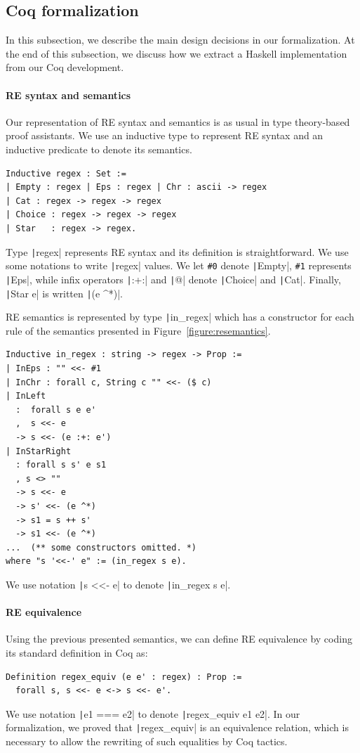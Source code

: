\documentclass[oneside,12pt]{scrbook}
\theoremstyle{definition}
\newcommand{\coq}[1]{\texttt|#1|}
\theoremstyle{plain}
\theoremstyle{definition}
\begin{document}
\subsection{Coq formalization}\label{subsection:coqformalization}

In this subsection, we describe the main design decisions in our formalization. At
the end of this subsection, we discuss how we extract a Haskell implementation from
our Coq development.

\paragraph{RE syntax and semantics} Our representation of RE syntax and
semantics is as usual in type theory-based proof assistants. We use an inductive
type to represent RE syntax and an inductive predicate to denote its semantics.

\begin{verbatim}
Inductive regex : Set :=
| Empty : regex | Eps : regex | Chr : ascii -> regex
| Cat : regex -> regex -> regex
| Choice : regex -> regex -> regex
| Star   : regex -> regex.
\end{verbatim}

Type \coq{regex} represents RE syntax and its definition is straightforward.
We use some notations to write \coq{regex} values. We let \verb|#0| denote
\coq{Empty}, \verb|#1| represents \coq{Eps}, while infix operators \coq{:+:} and
\coq{@} denote \coq{Choice} and \coq{Cat}. Finally, \coq{Star e} is
written \coq{(e ^*)}.

RE semantics is represented by type \coq{in_regex} which has a constructor for each
rule of the semantics presented in Figure~\ref{figure:resemantics}.

\begin{verbatim}
Inductive in_regex : string -> regex -> Prop :=
| InEps : "" <<- #1
| InChr : forall c, String c "" <<- ($ c)
| InLeft
  :  forall s e e'
  ,  s <<- e
  -> s <<- (e :+: e')
| InStarRight              
  : forall s s' e s1 
  , s <> ""  
  -> s <<- e
  -> s' <<- (e ^*)
  -> s1 = s ++ s'
  -> s1 <<- (e ^*)
...  (** some constructors omitted. *)
where "s '<<-' e" := (in_regex s e).
\end{verbatim}
We use notation \coq{s <<- e} to denote \coq{in_regex s e}.

\paragraph{RE equivalence} Using the previous presented semantics, we can define
RE equivalence by coding its standard definition in Coq as:
\begin{verbatim}
Definition regex_equiv (e e' : regex) : Prop :=
  forall s, s <<- e <-> s <<- e'.
\end{verbatim}
We use notation \coq{e1 === e2} to denote \coq{regex_equiv e1 e2}. In our
formalization, we proved that \coq{regex_equiv} is an equivalence relation,
which is necessary to allow the rewriting of such equalities by Coq
tactics.
\end{document}
